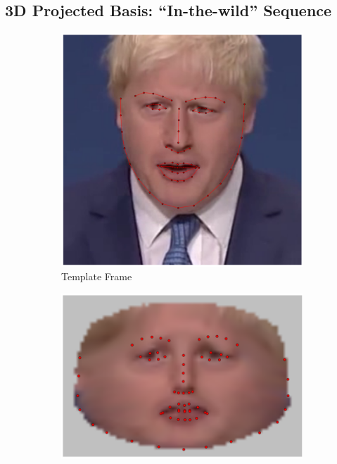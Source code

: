 \subsection{3D Projected Basis: ``In-the-wild'' Sequence}\label{subsec:face_flow_experiments_boris}
\begin{figure}
    \centering
    \hspace*{\fill}
    \begin{subfigure}[b]{0.163\textwidth}
        \centering
        \includegraphics[width=\textwidth]{face_flow/images/boris/boris_template}
        \caption*{Template Frame}
    \end{subfigure}  \hfill
    \begin{subfigure}[b]{0.23\textwidth}
        \centering
        \includegraphics[width=\textwidth]{face_flow/images/boris/boris_sampled_template_05}

\end{subfigure}
\end{figure}
